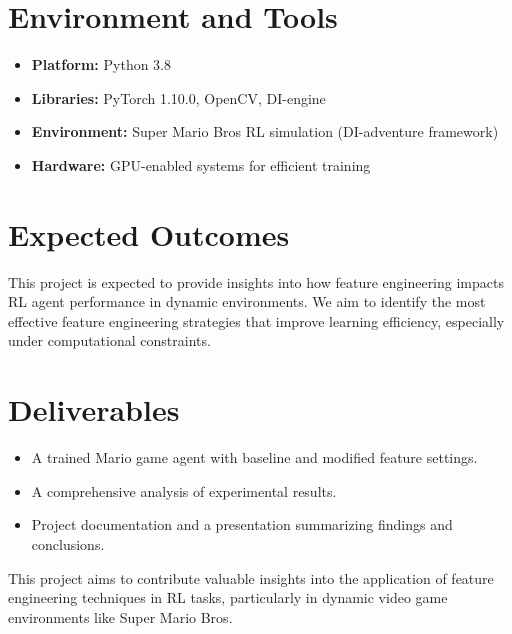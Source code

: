 \documentclass[12pt]{article}
\begin{document}
\section*{Environment and Tools}
\begin{itemize}
    \item \textbf{Platform:} Python 3.8
    \item \textbf{Libraries:} PyTorch 1.10.0, OpenCV, DI-engine
    \item \textbf{Environment:} Super Mario Bros RL simulation (DI-adventure framework)
    \item \textbf{Hardware:} GPU-enabled systems for efficient training
\end{itemize}

\section*{Expected Outcomes}
This project is expected to provide insights into how feature engineering impacts RL agent performance in dynamic environments. We aim to identify the most effective feature engineering strategies that improve learning efficiency, especially under computational constraints.

\section*{Deliverables}
\begin{itemize}
    \item A trained Mario game agent with baseline and modified feature settings.
    \item A comprehensive analysis of experimental results.
    \item Project documentation and a presentation summarizing findings and conclusions.
\end{itemize}

This project aims to contribute valuable insights into the application of feature engineering techniques in RL tasks, particularly in dynamic video game environments like Super Mario Bros.

\newpage
\end{document}
